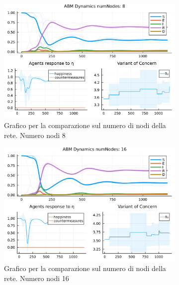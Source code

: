 \begin{figure}[H]
	\centering
	\begin{subfigure}[b]{0.45\textwidth}
		\centering
		\includegraphics[width=\textwidth]{img/SocialNetworkABM_1_NN.jpg}
		\caption{Grafico per la comparazione sul numero di nodi della rete. Numero nodi 8}
		\label{fig:comparison_numberOfNodes_8}
	\end{subfigure}
	\hfill
	\begin{subfigure}[b]{0.45\textwidth}
		\centering
		\includegraphics[width=\textwidth]{img/SocialNetworkABM_2_NN.jpg}
		\caption{Grafico per la comparazione sul numero di nodi della rete. Numero nodi 16}
		\label{fig:comparison_numberOfNodes_16}
	\end{subfigure}
	\hfill
	\begin{subfigure}[b]{0.45\textwidth}
		\centering

\end{subfigure}
\end{figure}

